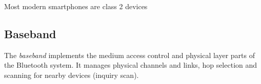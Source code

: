 \noindent
Most modern smartphones are class 2 devices

\subsection{Baseband}
The \emph{baseband} \cite{baseband} implements the medium access control and physical layer parts of the Bluetooth system.
It manages physical channels and links, hop selection and scanning for nearby devices (inquiry scan).

